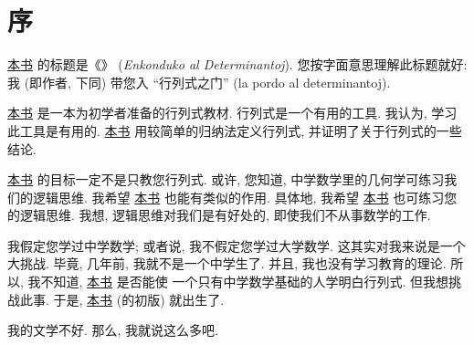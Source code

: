 \chapter{序}

\href{https://www.bananaspace.org/wiki/%E8%AE%B2%E4%B9%89:%E8%A1%8C%E5%88%97%E5%BC%8F%E5%85%A5%E9%97%A8}{本书}%
的标题是《\thetitle{}》
(\textit{Enkonduko al Determinantoj}).
您按字面意思理解此标题就好:
我
(即作者, 下同)
带您入 ``行列式之门''
(la pordo al determinantoj).

\href{https://www.bananaspace.org/wiki/%E8%AE%B2%E4%B9%89:%E8%A1%8C%E5%88%97%E5%BC%8F%E5%85%A5%E9%97%A8}{本书}%
是一本为初学者准备的行列式教材.
行列式是一个有用的工具.
我认为, 学习此工具是有用的.
\href{https://www.bananaspace.org/wiki/%E8%AE%B2%E4%B9%89:%E8%A1%8C%E5%88%97%E5%BC%8F%E5%85%A5%E9%97%A8}{本书}%
用较简单的归纳法定义行列式,
并证明了关于行列式的一些结论.

\href{https://www.bananaspace.org/wiki/%E8%AE%B2%E4%B9%89:%E8%A1%8C%E5%88%97%E5%BC%8F%E5%85%A5%E9%97%A8}{本书}%
的目标一定不是只教您行列式.
或许, 您知道,
中学数学里的几何学可练习我们的逻辑思维.
我希望%
\href{https://www.bananaspace.org/wiki/%E8%AE%B2%E4%B9%89:%E8%A1%8C%E5%88%97%E5%BC%8F%E5%85%A5%E9%97%A8}{本书}%
也能有类似的作用.
具体地, 我希望%
\href{https://www.bananaspace.org/wiki/%E8%AE%B2%E4%B9%89:%E8%A1%8C%E5%88%97%E5%BC%8F%E5%85%A5%E9%97%A8}{本书}%
也可练习您的逻辑思维.
我想, 逻辑思维对我们是有好处的,
即使我们不从事数学的工作.

我假定您学过中学数学;
或者说, 我不假定您学过大学数学.
这其实对我来说是一个大挑战.
毕竟, 几年前, 我就不是一个中学生了.
并且, 我也没有学习教育的理论.
所以, 我不知道,
\href{https://www.bananaspace.org/wiki/%E8%AE%B2%E4%B9%89:%E8%A1%8C%E5%88%97%E5%BC%8F%E5%85%A5%E9%97%A8}{本书}%
是否能使%
一个只有中学数学基础的人学明白行列式.
但我想挑战此事.
于是,
\href{https://www.bananaspace.org/wiki/%E8%AE%B2%E4%B9%89:%E8%A1%8C%E5%88%97%E5%BC%8F%E5%85%A5%E9%97%A8}{本书}
(的初版) 就出生了.

我的文学不好.
那么, 我就说这么多吧.
